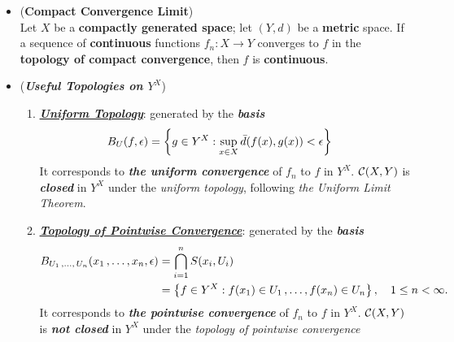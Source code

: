\documentclass[11pt]{article}
\begin{document}
\begin{itemize}
\begin{proof}
It suffices to show that $f|_C$ is \emph{continuous} for each \emph{compact subspace} $C$ of $X$, since by lemma above, we can extend $f$ on entire space. For each $n$, consider the \emph{neighborhood} $B_C(f, 1/n)$ of $f$; it \emph{intersects} $\cC(X, Y)$, so we can choose a function $f_n \in \cC(X, Y)$ lying in this neighborhood. The sequence of functions $f_n|_{C}: C \rightarrow Y$ \emph{converges uniformly} to the function $f|_C$, so that by \emph{the uniform limit theorem}, $f|_C$ is \emph{continuous}. \qed
\end{proof}

\item \begin{corollary} (\textbf{Compact Convergence Limit})  \citep{munkres2000topology}\\
Let $X$ be a \textbf{compactly generated space}; let $(Y, d)$ be a \textbf{metric} space. If a sequence of \textbf{continuous} functions $f_n : X \rightarrow Y$ converges to $f$ in the \textbf{topology of compact convergence}, then $f$ is \textbf{continuous}.
\end{corollary}

\item \begin{remark} (\emph{\textbf{Useful Topologies on $Y^X$}})
\begin{enumerate}
\item \underline{\emph{\textbf{Uniform Topology}}}: generated by the \emph{\textbf{basis}}
\begin{align*}
B_{U}(f, \epsilon) &= \left\{g \in Y^X: \sup_{x\in X}\bar{d}(f(x), g(x)) < \epsilon \right\}
\end{align*} It corresponds to \emph{\textbf{the uniform convergence}} of $f_n$ to $f$ in $Y^X$. $\cC(X, Y)$ is \emph{\textbf{closed}} in $Y^X$ under the \emph{uniform topology}, following \emph{the Uniform Limit Theorem}.

\item  \underline{\emph{\textbf{Topology of Pointwise Convergence}}}: generated by the \emph{\textbf{basis}}
\begin{align*}
B_{U_1 \,{,}\ldots{,}\, U_n}(x_1 \,{,}\ldots{,}\, x_n, \epsilon)  &= \bigcap_{i=1}^{n}S(x_i, U_i) \\
&= \left\{f \in Y^X: f(x_1) \in U_1 \,{,}\ldots{,}\, f(x_n) \in U_n\right\}, \quad   1 \le n < \infty.
\end{align*} It corresponds to \emph{\textbf{the pointwise convergence}} of $f_n$ to $f$ in $Y^X$. $\cC(X, Y)$ is \emph{\textbf{not closed}} in $Y^X$ under the \emph{topology of pointwise convergence}


\end{enumerate}
\end{remark}
\end{itemize}
\end{document}
